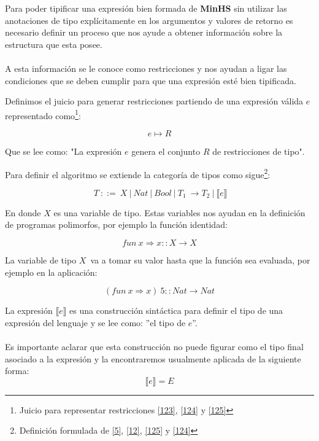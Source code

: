     Para poder tipificar una expresión bien formada de \textbf{MinHS}  sin utilizar las anotaciones de tipo explícitamente en los argumentos y valores de retorno es necesario definir un proceso que nos ayude a obtener información sobre la estructura que esta posee. \\\\
    A esta información se le conoce como restricciones y nos ayudan a ligar las condiciones que se deben cumplir para que una expresión esté bien tipificada.

    \begin{definition}
        Definimos el juicio para generar restricciones partiendo de una expresión válida $e$ representado como\footnote{Juicio para representar restricciones \hyperlink{123}{[123]},  \hyperlink{124}{[124]} y \hyperlink{125}{[125]}}:
    
        $$e\mapsto R$$
        
        Que se lee como: "La expresión $e$ genera el conjunto $R$ de restricciones de tipo".
    \end{definition}


    \begin{definition}
        Para definir el algoritmo se extiende la categoría de tipos como sigue\footnote{Definición formulada de \hyperlink{5}{[5]},  \hyperlink{12}{[12]}, \hyperlink{125}{[125]} y \hyperlink{124}{[124]}}:
        
        $$\ T\ ::=\ X\ |\ Nat\ |\ Bool\ |\ T_1\ \to T_2\ |\ \llbracket e \rrbracket$$
        
        En donde $X$ es una variable de tipo. Estas variables nos ayudan en la definición de programas polimorfos, por ejemplo la función identidad:
        
        $$fun\ x\Rightarrow x :: X \to X$$ 
        
        La variable de tipo $X$$\,$ va a tomar su valor hasta que la función sea evaluada, por ejemplo en la aplicación:
       
        $$(fun \ x \Rightarrow x)\ 5 :: Nat \to Nat$$

        La expresión $\llbracket e \rrbracket$ es una construcción sintáctica para definir el tipo de una expresión del lenguaje y se lee como: ''el tipo de $e$''.\\\\
        Es importante aclarar que esta construcción no puede figurar como el tipo final asociado a la expresión y la encontraremos usualmente aplicada de la siguiente forma: $$\llbracket e \rrbracket = E $$
            
    \end{definition}

